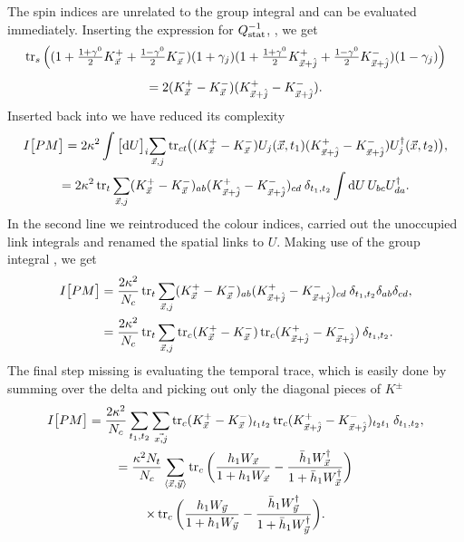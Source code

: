 The spin indices are unrelated to the group integral and can be evaluated
immediately. Inserting the expression for $Q_{\text{stat}}^{-1}$, ,
we get
%
\begin{multline} \textstyle
  \operatorname{tr}_s \Big( ( 1
   + \frac{1 + \gamma^0}{2} K^+_{\vec{x}}
   + \frac{1 - \gamma^0}{2} K^-_{\vec{x}} ) (1+\gamma_j)
  ( 1 + \frac{1 + \gamma^0}{2} K^+_{\vec{x}+\hat{j}}
   + \frac{1 - \gamma^0}{2} K^-_{\vec{x}+\hat{j}} ) (1-\gamma_j) \Big) \\[5pt]
   = 2 (K^+_{\vec{x}} - K^-_{\vec{x}})
    (K^+_{\vec{x}+\hat{j}} - K^-_{\vec{x}+\hat{j}}).
\end{multline}
%
Inserted back into  we have reduced its
complexity
%
\begin{multline}
  I\big[PM\big]
   = 2\kappa^2 \int \big[ \mathrm{d} U \big]_i \scalemath{0.95}{\sum_{\vec{x}, j}} \tr_{ct} \hskip-.5ex
   \big( (K^+_{\vec{x}} - K^-_{\vec{x}}) U_j(\vec{x},t_1) 
   (K^+_{\vec{x}+\hat{j}} - K^-_{\vec{x}+\hat{j}})U^{\dagger}_j(\vec{x},t_2) \big), \\
  = 2\kappa^2 \tr_t \scalemath{0.95}{\sum_{\vec{x}, j}}
    (K^+_{\vec{x}} - K^-_{\vec{x}})_{ab} (K^+_{\vec{x}+\hat{j}} - K^-_{\vec{x}+\hat{j}})_{cd}
    \>\delta_{t_1,t_2} \int \mathrm{d} U \, U_{bc} U^{\dagger}_{da}.
\end{multline}
%
In the second line we reintroduced the colour indices, carried out the
unoccupied link integrals and renamed the spatial links to $U$. Making use of
the group integral , we get
%
\begin{align}
  I\big[ PM \big] &= \frac{2\kappa^2}{N_c} \tr_t \scalemath{0.95}{\sum_{\vec{x}, j}}
    (K^+_{\vec{x}} - K^-_{\vec{x}})_{ab} (K^+_{\vec{x}+\hat{j}} - K^-_{\vec{x}+\hat{j}})_{cd}
    \>\delta_{t_1,t_2} \delta_{ab} \delta_{cd}, \nonumber\\
  &=\frac{2\kappa^2}{N_c} \tr_t \scalemath{0.95}{\sum_{\vec{x}, j}}
   \tr_c (K^+_{\vec{x}} - K^-_{\vec{x}}) \tr_c (K^+_{\vec{x}+\hat{j}} - K^-_{\vec{x}+\hat{j}})
    \>\delta_{t_1,t_2}.
\end{align}
%
The final step missing is evaluating the temporal trace, which is easily done by
summing over the delta and picking out only the diagonal pieces of $K^{\pm}$
%
\begin{multline}
  I\big[ PM \big] = \frac{2\kappa^2}{N_c} \sum_{t_1, t_2} \sum_{\vec{x, j}}
   \operatorname{tr}_c (K^+_{\vec{x}} - K^-_{\vec{x}})_{t_1 t_2} \operatorname{tr}_c (K^+_{\vec{x}+\hat{j}} - K^-_{\vec{x}+\hat{j}})_{t_2 t_1}
    \>\delta_{t_1,t_2}, \\
  = \frac{\kappa^2 N_t}{N_c} \sum_{\langle \vec{x}, \vec{y} \rangle}
    \operatorname{tr}_c \bigg(\frac{h_1 W_{\vec{x}}}{1 + h_1 W_{\vec{x}}}
    - \frac{\bar{h}_1 W_{\vec{x}}^{\dagger}}{1 + \bar{h}_1 W_{\vec{x}}^{\dagger}}\bigg) \\
  \times \operatorname{tr}_c \bigg(\frac{h_1 W_{\vec{y}}}{1 + h_1 W_{\vec{y}}}
    - \frac{\bar{h}_1 W_{\vec{y}}^{\dagger}}{1 + \bar{h}_1 W_{\vec{y}}^{\dagger}}\bigg).
\end{multline}
